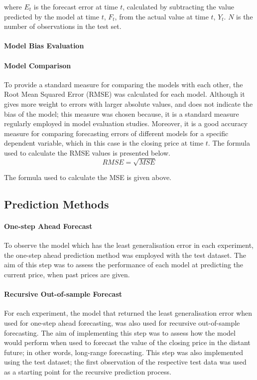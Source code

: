 \documentclass[13pt]{report}
\begin{document}
where $E_{t}$ is the forecast error at time $t$, calculated by subtracting the value predicted by the model at time $t$, $F_{t}$, from the actual value at time $t$, $Y_{t}$. $N$ is the number of observations in the test set.

\paragraph{Model Bias Evaluation} \hfill \break



\paragraph{Model Comparison}\hfill \break
To provide a standard measure for comparing the models with each other, the Root Mean Squared Error (RMSE) was calculated for each model. Although it gives more weight to errors with larger absolute values, and does not indicate the bias of the model; this measure was chosen because, it is a standard measure regularly employed in model evaluation studies. Moreover, it is a good accuracy measure for comparing forecasting errors of different models for a specific dependent variable, which in this case is the closing price at time $t$. The formula used to calculate the RMSE values is presented below.
\[RMSE = \sqrt{MSE}\]

The formula used to calculate the MSE is given above.


\subsection{Prediction Methods}
\paragraph{One-step Ahead Forecast}\hfill \break
To observe the model which has the least generalisation error in each experiment, the one-step ahead prediction method was employed with the test dataset. The aim of this step was to assess the performance of each model at predicting the current price, when past prices are given.

\paragraph{Recursive Out-of-sample Forecast} \hfill \break
For each experiment, the model that returned the least generalisation error when used for one-step ahead forecasting, was also used for recursive out-of-sample forecasting. The aim of implementing this step was to assess how the model would perform when used to forecast the value of the closing price in the distant future; in other words, long-range forecasting. This step was also implemented using the test dataset; the first observation of the respective test data was used as a starting point for the recursive prediction process.
\end{document}
